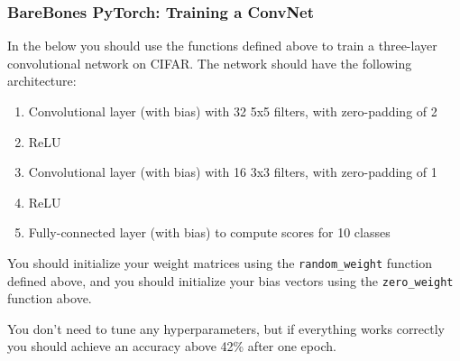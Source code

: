 \documentclass[11pt]{article}
\providecommand{\tightlist}{%
      \setlength{\itemsep}{0pt}\setlength{\parskip}{0pt}}
\begin{document}
    \subsubsection{BareBones PyTorch: Training a
ConvNet}\label{barebones-pytorch-training-a-convnet}

In the below you should use the functions defined above to train a
three-layer convolutional network on CIFAR. The network should have the
following architecture:

\begin{enumerate}
\def\labelenumi{\arabic{enumi}.}
\tightlist
\item
  Convolutional layer (with bias) with 32 5x5 filters, with zero-padding
  of 2
\item
  ReLU
\item
  Convolutional layer (with bias) with 16 3x3 filters, with zero-padding
  of 1
\item
  ReLU
\item
  Fully-connected layer (with bias) to compute scores for 10 classes
\end{enumerate}

You should initialize your weight matrices using the
\texttt{random\_weight} function defined above, and you should
initialize your bias vectors using the \texttt{zero\_weight} function
above.

You don't need to tune any hyperparameters, but if everything works
correctly you should achieve an accuracy above 42\% after one epoch.
\end{document}
